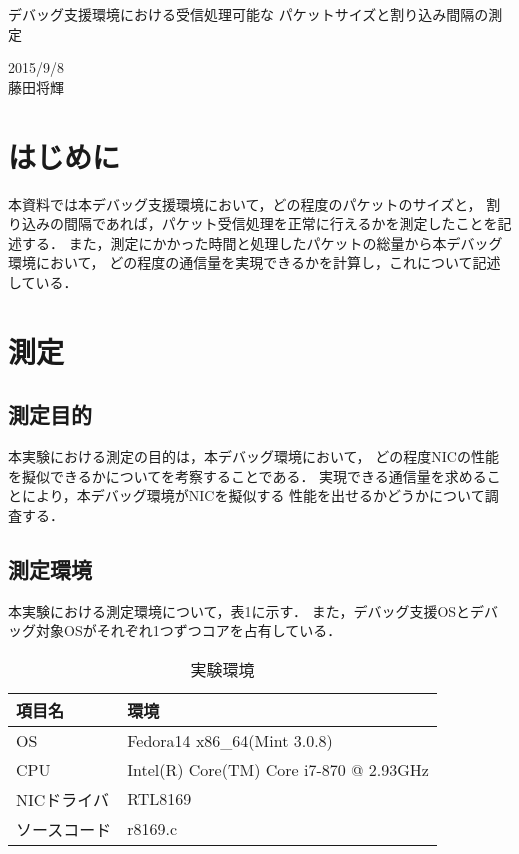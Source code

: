 \documentclass[12pt]{jsarticle}
\begin{document}

\begin{center}
    {\LARGE デバッグ支援環境における受信処理可能な
    パケットサイズと割り込み間隔の測定}
\end{center}

\begin{flushright}
    2015/9/8\\
    藤田将輝
\end{flushright}
\section{はじめに}
本資料では本デバッグ支援環境において，どの程度のパケットのサイズと，
割り込みの間隔であれば，パケット受信処理を正常に行えるかを測定したことを記述する．
また，測定にかかった時間と処理したパケットの総量から本デバッグ環境において，
どの程度の通信量を実現できるかを計算し，これについて記述している．

\section{測定}
\subsection{測定目的}
本実験における測定の目的は，本デバッグ環境において，
どの程度NICの性能を擬似できるかについてを考察することである．
実現できる通信量を求めることにより，本デバッグ環境がNICを擬似する
性能を出せるかどうかについて調査する．

\subsection{測定環境}
本実験における測定環境について，表1に示す．
また，デバッグ支援OSとデバッグ対象OSがそれぞれ1つずつコアを占有している．
\begin{table}[htbp]
    \caption{実験環境}
    \label{kankyou}
    \begin{center}
        \begin{tabular}{l|l}   \hline \hline 
            項目名      & 環境    \\ \hline
            OS          & Fedora14 x86\_64(Mint 3.0.8)  \\ 
            CPU         & Intel(R) Core(TM) Core i7-870 @ 2.93GHz \\ 
            NICドライバ & RTL8169    \\ 
            ソースコード& r8169.c \\ \hline
        \end{tabular}
    \end{center}
\end{table}
\end{document}
